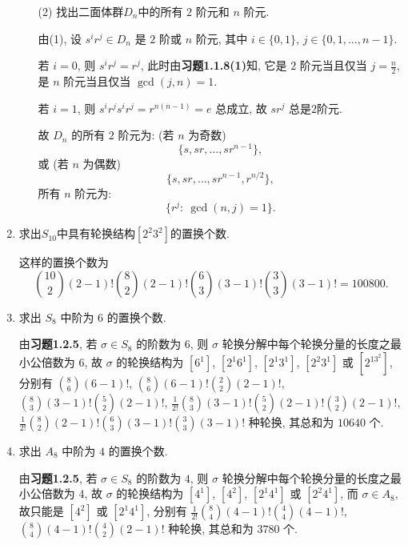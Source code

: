 \begin{enumerate}
\begin{enumerate}
\item[(2)] 找出二面体群$D_{n}$中的所有 $2$ 阶元和 $n$ 阶元.
\begin{solution}
    由(1), 设 $s^ir^j\in D_{n}$ 是 $2$ 阶或 $n$ 阶元, 其中 $i\in\{0,1\}$, $j\in\{0,1,\dots,n-1\}$.

    若 $i=0$, 则 $s^ir^j=r^j$,
    此时由\textbf{习题1.1.8(1)}知, 它是 $2$ 阶元当且仅当 $j=\frac{n}{2}$,
    是 $n$ 阶元当且仅当 $\gcd(j,n)=1$.

    若 $i=1$, 则 $s^ir^js^ir^j=r^{n(n-1)}=e$ 总成立, 故 $sr^j$ 总是$2$阶元.

    故 $D_n$ 的所有 $2$ 阶元为: (若 $n$ 为奇数)
    $$\{s,sr,\dots,sr^{n-1}\},$$
    或 (若 $n$ 为偶数)
    $$\{s,sr,\dots,sr^{n-1},r^{n/2}\},$$
    所有 $n$ 阶元为:
    $$\{r^j:\ \gcd(n,j)=1\}.$$
\end{solution}
\end{enumerate}


\item 求出$S_{10}$中具有轮换结构$\left[2^2 3^2\right]$的置换个数.
\begin{solution}
    这样的置换个数为
    $${10 \choose 2}(2-1)!{8 \choose 2}(2-1)!{6 \choose 3}(3-1)!{3 \choose 3}(3-1)!=100800.$$
\end{solution}

\item 求出 $S_8$ 中阶为 $6$ 的置换个数.
\begin{solution}
    由\textbf{习题1.2.5},
    若 $\sigma\in S_8$ 的阶数为 $6$,
    则 $\sigma$ 轮换分解中每个轮换分量的长度之最小公倍数为 $6$,
    故 $\sigma$ 的轮换结构为 $[6^1]$, $[2^1 6^1]$, $[2^1 3^1]$, $[2^2 3^1]$ 或 $[2^13^2]$,
    分别有 ${8 \choose 6}(6-1)!$, ${8 \choose 6}(6-1)!{2 \choose 2}(2-1)!$, ${8 \choose 3}(3-1)!{5 \choose 2}(2-1)!$, $\frac{1}{2!}{8 \choose 3}(3-1)!{5 \choose 2}(2-1)!{3 \choose 2}(2-1)!$, $\frac{1}{2!}{8 \choose 2}(2-1)!{6 \choose 3}(3-1)!{3 \choose 3}(3-1)!$ 种轮换,
    其总和为 $10640$ 个. 
\end{solution}

\item 求出 $A_8$ 中阶为 $4$ 的置换个数.
\begin{solution}
    由\textbf{习题1.2.5},
    若 $\sigma\in S_8$ 的阶数为 $4$,
    则 $\sigma$ 轮换分解中每个轮换分量的长度之最小公倍数为 $4$,
    故 $\sigma$ 的轮换结构为 $[4^1]$, $[4^2]$, $[2^1 4^1]$ 或 $[2^2 4^1]$,
    而 $\sigma\in A_8$, 故只能是 $[4^2]$ 或 $[2^1 4^1]$, 
    分别有 $\frac{1}{2!}{8 \choose 4}(4-1)!{4 \choose 4}(4-1)!$, ${8 \choose 4}(4-1)!{4 \choose 2}(2-1)!$ 种轮换,
    其总和为 $3780$ 个. 
\end{solution}

\end{enumerate}


